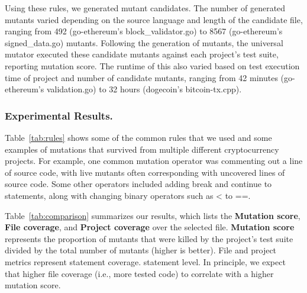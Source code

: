 Using these rules, we generated mutant candidates. The number of generated mutants varied depending
on the source language and length of the candidate file, ranging from 492 (go-ethereum's block\_validator.go) to 
8567 (go-ethereum's signed\_data.go) mutants. Following the generation of mutants, the universal mutator
executed these candidate mutants against each project's test suite, reporting mutation score. The runtime
of this also varied based on test execution time of project and number of candidate mutants, ranging from
42 minutes (go-ethereum's validation.go) to 32 hours (dogecoin's bitcoin-tx.cpp).

\subsubsection*{Experimental Results.}


Table~\ref{tab:rules} shows some of the common rules that we used and some examples of mutations that survived
from multiple different cryptocurrency projects. For example, one common mutation operator was commenting out a line
of source code, with live mutants often corresponding with uncovered lines of source code. Some other operators
included adding break and continue to statements, along with changing binary operators such as < to ==.

Table~\ref{tab:comparison} summarizes our results, which lists the
\textbf{Mutation score}, \textbf{File coverage}, and \textbf{Project coverage}
over the selected file. \textbf{Mutation score} represents the proportion of
mutants that were killed by the project's test suite divided by the total number
of mutants (higher is better). File and project metrics represent statement
coverage. statement level. In principle, we expect that higher file coverage
(i.e., more tested code) to correlate with a higher mutation score.


